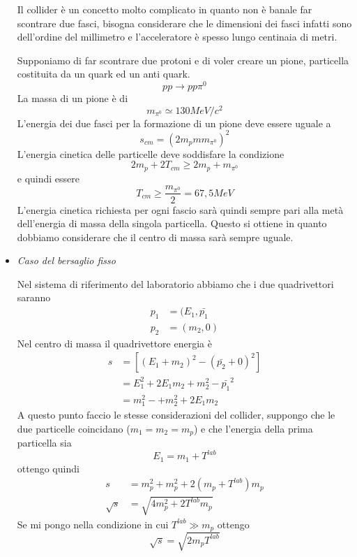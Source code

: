 \begin{itemize}
Il collider è un concetto molto complicato in quanto non è banale far scontrare due fasci, bisogna considerare che le dimensioni dei fasci infatti sono dell'ordine del millimetro e l'acceleratore è spesso lungo centinaia di metri.

Supponiamo di far scontrare due protoni e di voler creare un pione, particella costituita da un quark ed un anti quark.
\begin{equation}
pp\to pp\pi^0
\end{equation}
La massa di un pione è di 
\begin{equation}
m_{\pi^0}\simeq 130MeV/c^2
\end{equation}
L'energia dei due fasci per la formazione di un pione deve essere uguale a 
\begin{equation}
s_{cm}=(2m_pmm_{\pi^0})^2
\end{equation}
L'energia cinetica delle particelle deve soddisfare la condizione
\begin{equation}
2m_p+2T_{cm}\ge 2m_p+m_{\pi^0}
\end{equation}
e quindi essere
\begin{equation}
T_{cm}\ge \frac{m_{\pi^0}}{2}=67,5MeV
\end{equation}
L'energia cinetica richiesta per ogni fascio sarà quindi sempre pari alla metà dell'energia di massa della singola particella.
Questo si ottiene in quanto dobbiamo considerare che il centro di massa sarà sempre uguale.

\item \emph{Caso del bersaglio fisso}

Nel sistema di riferimento del laboratorio abbiamo che i due quadrivettori saranno 
\begin{equation}
\begin{split}
p_1&=(E_1,\bar{p_1}\\
p_2&=(m_2,0)
\end{split}
\end{equation}
Nel centro di massa il quadrivettore energia è 
\begin{equation}
\begin{split}
s&=[(E_1+m_2)^2-(\bar{p_2}+0)^2]\\
&=E_1^2+2E_1m_2+m_2^2-\bar{p_1}^2\\
&=m_1^2-+m_2^2+2E_1m_2
\end{split}
\end{equation}
A questo punto faccio le stesse considerazioni del collider, suppongo che le due particelle coincidano ($m_1=m_2=m_p$) e che l'energia della prima particella sia
\begin{equation}
E_1=m_1+T^{lab}
\end{equation}
ottengo quindi 
\begin{equation}
\begin{split}
s & =m_p^2 + m_p^2 + 2(m_p+T^{lab})m_p\\
\sqrt{s}&=\sqrt{4m_p^2+2T^{lab}m_p}
\end{split}
\end{equation}
Se mi pongo nella condizione in cui $T^{lab}\gg m_p$ ottengo
\begin{equation}
\sqrt{s}=\sqrt{2m_pT^{lab}}
\end{equation}


\end{itemize}
